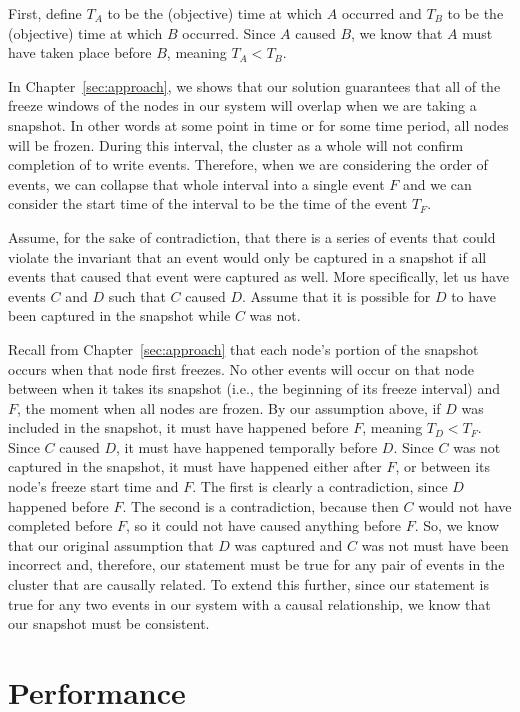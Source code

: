 First, define $T_A$ to be the (objective) time at which $A$ occurred
and $T_B$ to be the (objective) time at which $B$ occurred. Since $A$
caused $B$, we know that $A$ must have taken place before $B$, meaning
$T_A < T_B$.

In Chapter~\ref{sec:approach}, we shows that our solution guarantees that all 
of the freeze windows of the nodes in
our system will overlap when we are taking a snapshot. In other
words at some point in time or for some time period, all nodes will be
frozen.  During this interval, the cluster as a whole will not confirm
completion of to write events. Therefore, when we are considering the
order of events, we can collapse that whole interval into a single
event $F$ and we can consider the start time of the interval to be the
time of the event $T_F$.

Assume, for the sake of contradiction, that there is a series of
events that could violate the invariant that an event would only be captured in a snapshot if all events that caused that event were captured as well. More specifically,
let us have events $C$ and $D$ such that $C$ caused $D$. Assume that
it is possible for $D$ to have been captured in the snapshot while $C$
was not.

Recall from Chapter~\ref{sec:approach} that each node's portion of the snapshot occurs when that node
first freezes. No other events will occur on that node between when it
takes its snapshot (i.e., the beginning of its freeze interval) and
$F$, the moment when all nodes are frozen. By our assumption above, if $D$ was
included in the snapshot, it must have happened before $F$, meaning
$T_D <T_F$. Since $C$ caused $D$, it must have happened temporally
before $D$.  Since $C$ was not captured in the snapshot, it must have
happened either after $F$, or between its node's freeze start time and
$F$. The first is clearly a contradiction, since $D$ happened before
$F$. The second is a contradiction, because then $C$ would not have
completed before $F$, so it could not have caused anything before
$F$. So, we know that our original assumption that $D$ was captured and $C$ was not must have been incorrect
and, therefore, our statement must be true for any pair of events in
the cluster that are causally related. To extend this further, since our statement is true for any two events in our system with a
causal relationship, we know that our snapshot must be consistent.

\section{Performance}

